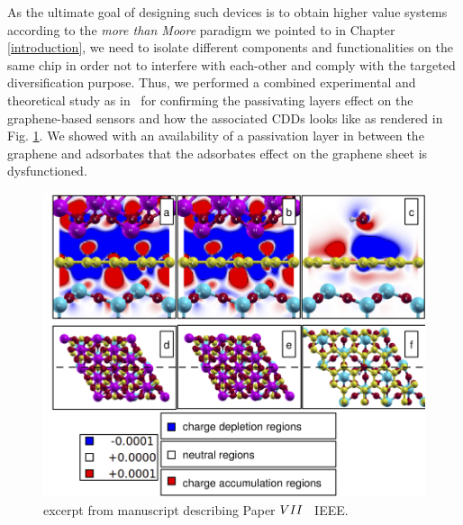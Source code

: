 As the ultimate goal of designing such devices is to obtain higher value systems according to the \textit{more than Moore} paradigm we pointed to in Chapter \ref{introduction}, we need to isolate different components and functionalities on the same chip in order not to interfere with each-other and comply with the targeted diversification purpose. Thus, we performed a combined experimental and theoretical study as in~\cite{Smith2016} for confirming the passivating layers effect on the graphene-based sensors and how the associated CDDs looks like as rendered in Fig. \ref{paper7}. We showed with an availability of a passivation layer in between the graphene and adsorbates that the adsorbates effect on the graphene sheet is dysfunctioned.

\begin{figure}
    \centering
    \includegraphics[width=\textwidth]{Figs/Paper7.png}
    \caption{excerpt from manuscript describing Paper \hyperref[P7]{$\Rmnum{7}$}~\cite{Smith2016} IEEE.}
    \label{paper7}
\end{figure}
\endinput
